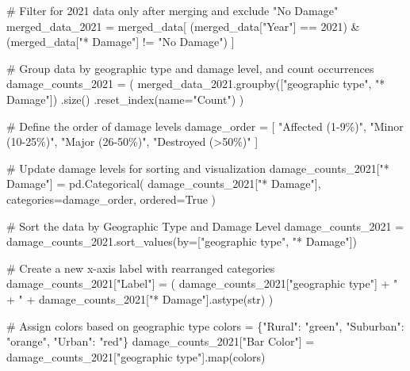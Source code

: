 \documentclass[
  letterpaper,
  DIV=11,
  numbers=noendperiod]{scrartcl}
\newenvironment{Shaded}{\begin{snugshade}}{\end{snugshade}}
\newcommand{\BuiltInTok}[1]{\textcolor[rgb]{0.00,0.23,0.31}{#1}}
\newcommand{\CommentTok}[1]{\textcolor[rgb]{0.37,0.37,0.37}{#1}}
\newcommand{\DecValTok}[1]{\textcolor[rgb]{0.68,0.00,0.00}{#1}}
\newcommand{\NormalTok}[1]{\textcolor[rgb]{0.00,0.23,0.31}{#1}}
\newcommand{\OperatorTok}[1]{\textcolor[rgb]{0.37,0.37,0.37}{#1}}
\newcommand{\StringTok}[1]{\textcolor[rgb]{0.13,0.47,0.30}{#1}}
\newcommand{\VariableTok}[1]{\textcolor[rgb]{0.07,0.07,0.07}{#1}}
\begin{document}
\begin{Shaded}
\begin{Highlighting}[]
\CommentTok{\# Filter for 2021 data only after merging and exclude "No Damage"}
\NormalTok{merged\_data\_2021 }\OperatorTok{=}\NormalTok{ merged\_data[}
\NormalTok{    (merged\_data[}\StringTok{"Year"}\NormalTok{] }\OperatorTok{==} \DecValTok{2021}\NormalTok{) }\OperatorTok{\&}
\NormalTok{    (merged\_data[}\StringTok{"* Damage"}\NormalTok{] }\OperatorTok{!=} \StringTok{"No Damage"}\NormalTok{)}
\NormalTok{]}

\CommentTok{\# Group data by geographic type and damage level, and count occurrences}
\NormalTok{damage\_counts\_2021 }\OperatorTok{=}\NormalTok{ (}
\NormalTok{    merged\_data\_2021.groupby([}\StringTok{"geographic type"}\NormalTok{, }\StringTok{"* Damage"}\NormalTok{])}
\NormalTok{    .size()}
\NormalTok{    .reset\_index(name}\OperatorTok{=}\StringTok{"Count"}\NormalTok{)}
\NormalTok{)}

\CommentTok{\# Define the order of damage levels}
\NormalTok{damage\_order }\OperatorTok{=}\NormalTok{ [}
    \StringTok{"Affected (1{-}9\%)"}\NormalTok{, }
    \StringTok{"Minor (10{-}25\%)"}\NormalTok{, }
    \StringTok{"Major (26{-}50\%)"}\NormalTok{, }
    \StringTok{"Destroyed (\textgreater{}50\%)"}
\NormalTok{]}

\CommentTok{\# Update damage levels for sorting and visualization}
\NormalTok{damage\_counts\_2021[}\StringTok{"* Damage"}\NormalTok{] }\OperatorTok{=}\NormalTok{ pd.Categorical(}
\NormalTok{    damage\_counts\_2021[}\StringTok{"* Damage"}\NormalTok{], categories}\OperatorTok{=}\NormalTok{damage\_order, ordered}\OperatorTok{=}\VariableTok{True}
\NormalTok{)}

\CommentTok{\# Sort the data by Geographic Type and Damage Level}
\NormalTok{damage\_counts\_2021 }\OperatorTok{=}\NormalTok{ damage\_counts\_2021.sort\_values(by}\OperatorTok{=}\NormalTok{[}\StringTok{"geographic type"}\NormalTok{, }\StringTok{"* Damage"}\NormalTok{])}

\CommentTok{\# Create a new x{-}axis label with rearranged categories}
\NormalTok{damage\_counts\_2021[}\StringTok{"Label"}\NormalTok{] }\OperatorTok{=}\NormalTok{ (}
\NormalTok{    damage\_counts\_2021[}\StringTok{"geographic type"}\NormalTok{] }\OperatorTok{+} \StringTok{" + "} \OperatorTok{+}\NormalTok{ damage\_counts\_2021[}\StringTok{"* Damage"}\NormalTok{].astype(}\BuiltInTok{str}\NormalTok{)}
\NormalTok{)}

\CommentTok{\# Assign colors based on geographic type}
\NormalTok{colors }\OperatorTok{=}\NormalTok{ \{}\StringTok{"Rural"}\NormalTok{: }\StringTok{"green"}\NormalTok{, }\StringTok{"Suburban"}\NormalTok{: }\StringTok{"orange"}\NormalTok{, }\StringTok{"Urban"}\NormalTok{: }\StringTok{"red"}\NormalTok{\}}
\NormalTok{damage\_counts\_2021[}\StringTok{"Bar Color"}\NormalTok{] }\OperatorTok{=}\NormalTok{ damage\_counts\_2021[}\StringTok{"geographic type"}\NormalTok{].}\BuiltInTok{map}\NormalTok{(colors)}


\end{Highlighting}
\end{Shaded}
\end{document}
